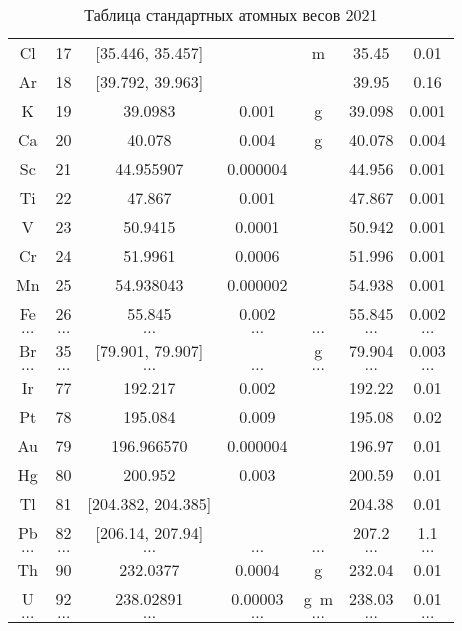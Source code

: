 \documentclass[a5paper,openany]{book}
\begin{document}
\begin{table}[h!]
{\begin{tabular}{ccccccc}
			Cl & 17 & [35.446, 35.457] & ~ & m  & 35.45 & 0.01 \\ [1mm]
			Ar & 18 & [39.792, 39.963] & ~ & ~  & 39.95 & 0.16 \\ [1mm]
			K & 19 & 39.0983 & 0.001 & g  & 39.098 & 0.001 \\ [1mm]
			Ca & 20 & 40.078 & 0.004 & g  & 40.078 & 0.004\\ [1mm]
			Sc & 21 & 44.955907 & 0.000004 & ~  & 44.956 & 0.001\\ [1mm]
			Ti & 22 & 47.867 & 0.001 & ~  & 47.867 & 0.001\\ [1mm]
			V & 23 & 50.9415 & 0.0001 & ~  & 50.942 & 0.001\\ [1mm]
			Cr & 24 & 51.9961 & 0.0006 & ~  & 51.996 & 0.001\\ [1mm]
			Mn & 25 & 54.938043 & 0.000002 & ~  & 54.938 & 0.001\\ [1mm]
			Fe & 26 & 55.845 & 0.002 & ~  & 55.845 & 0.002\\ [1mm]
			$\ldots$ & $\ldots$ & $\ldots$ & $\ldots$ & $\ldots$  & $\ldots$ & $\ldots$\\ [1mm]
			Br & 35 & [79.901, 79.907] & ~ & g  & 79.904 & 0.003\\ [1mm]
			$\ldots$ & $\ldots$ & $\ldots$ & $\ldots$ & $\ldots$  & $\ldots$ & $\ldots$\\ [1mm]
			Ir & 77 &  192.217 & 0.002 & ~  & 192.22 & 0.01\\ [1mm]
			Pt & 78 & 195.084 & 0.009 & ~  & 195.08 & 0.02\\ [1mm]
			Au & 79 & 196.966570 & 0.000004 & ~  & 196.97 & 0.01\\ [1mm]
			Hg & 80 & 200.952 & 0.003 & ~  & 200.59 & 0.01\\ [1mm]
			Tl & 81 & [204.382, 204.385] & ~ & ~  & 204.38 & 0.01\\ [1mm]
			Pb & 82 & [206.14, 207.94] & ~ & ~  & 207.2 & 1.1\\ [1mm]
			$\ldots$ & $\ldots$ & $\ldots$ & $\ldots$ & $\ldots$  & $\ldots$ & $\ldots$\\ [1mm]
			Th & 90 & 232.0377 & 0.0004 & g  & 232.04 & 0.01\\ [1mm]
			U & 92 & 238.02891 & 0.00003 & g~m  & 238.03 & 0.01\\ [1mm]
			$\ldots$ & $\ldots$ & $\ldots$ & $\ldots$ & $\ldots$  & $\ldots$ & $\ldots$\\ [1mm]
			\hline 
		\end{tabular}
	}
	\caption{Таблица стандартных атомных весов 2021}
	\label{t:TSAW2021}
\end{table} 
\end{document}
